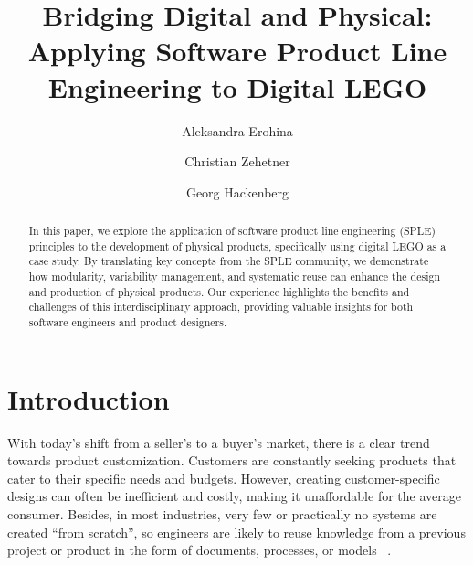 \documentclass[sigconf,review]{acmart}
\begin{document}
\title{Bridging Digital and Physical: Applying Software Product Line Engineering to Digital LEGO}

\author{Aleksandra Erohina}

\author{Christian Zehetner}

\author{Georg Hackenberg}

\begin{abstract}
    In this paper, we explore the application of software product line engineering (SPLE) principles to the development of physical products, specifically using digital LEGO as a case study. 
    By translating key concepts from the SPLE community, we demonstrate how modularity, variability management, and systematic reuse can enhance the design and production of physical products. 
    Our experience highlights the benefits and challenges of this interdisciplinary approach, providing valuable insights for both software engineers and product designers.
\end{abstract}


\maketitle

\section{Introduction}
\label{sec:introduction}


With today's shift from a seller's to a buyer's market, there is a clear trend towards product customization. 
Customers are constantly seeking products that cater to their specific needs and budgets. 
However, creating customer-specific designs can often be inefficient and costly, making it unaffordable for the average consumer.
Besides, in most industries, very few or practically no systems are created “from scratch”, so engineers are likely to reuse knowledge from a previous project or product in the form of documents, processes, or models ~\cite{Góngora_2015}. 
\end{document}
